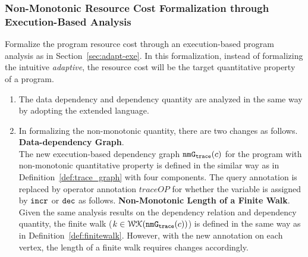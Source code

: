 \subsubsection{Non-Monotonic Resource Cost Formalization through Execution-Based Analysis} 
Formalize the program resource cost through an execution-based program analysis as in Section~\ref{sec:adapt-exe}.
In this formalization, instead of formalizing the intuitive \emph{adaptive}, the resource cost will be the
target quantitative property of a program.
\begin{enumerate}
 \item The data dependency and dependency quantity are analyzed in the same way by adopting the extended language.
 \item In formalizing the non-monotonic quantity, there are two changes as follows.
 \\
 \textbf{Data-dependency Graph}.
 \\
 The new execution-based dependency graph $\mathtt{nmG_{trace}}(c)$ for the program with non-monotonic quantitative property is defined in the
 similar way as in Definition~\ref{def:trace_graph} with four components.
 The query annotation is replaced by operator annotation $traceOP$ for whether the variable is assigned by $\mathtt{incr}$ or $\mathtt{dec}$ as follows.
 \textbf{Non-Monotonic Length of a Finite Walk}.
 \\
 Given the same analysis results on the dependency relation and dependency quantity, 
 the finite walk ($k \in \mathcal{WK}(\mathtt{nmG_{trace}}(c))$) is defined in the same way as in Definition~\ref{def:finitewalk}. However, with the new annotation on each vertex, the length of a finite walk requires changes accordingly.
\end{enumerate}
